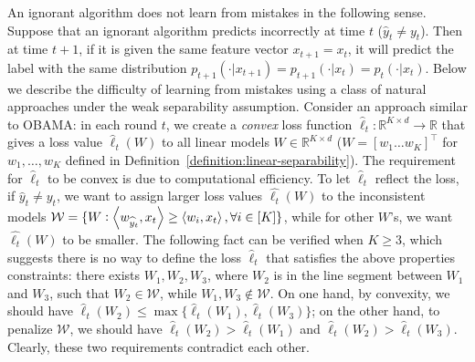 An ignorant algorithm does not learn from mistakes in the following sense. Suppose that an ignorant algorithm predicts incorrectly at time $t$ ($\widehat y_t \neq y_t$).
Then at time $t+1$, if it is given the same feature vector $x_{t+1}=x_t$, it will predict the label with the same distribution $p_{t+1}(\cdot|x_{t+1})=p_{t+1}(\cdot|x_t)=p_t(\cdot|x_t)$.
Below we describe the difficulty of learning from mistakes using a class of natural approaches under the weak separability assumption.
Consider an approach similar to OBAMA: in each round $t$,
we create a \textit{convex} loss function $\widehat \ell_t: \mathbb{R}^{K\times d}\rightarrow \mathbb{R}$ that gives a loss value $\widehat \ell_t(W)$ to
all linear models $W\in\mathbb{R}^{K\times d}$ ($W=[w_1 \ldots w_K]^\top$ for $w_1, \ldots, w_K$ defined in Definition~\ref{definition:linear-separability}).
The requirement for $\widehat{\ell}_t$ to be convex is due to computational efficiency.
To let $\widehat{\ell}_t$ reflect the loss, if $\widehat y_t \neq y_t$, we want to assign larger loss values $\widehat{\ell_t}(W)$ to the inconsistent models $\mathcal{W}=\{W: \left\langle w_{\widehat y_t}, x_t \right\rangle \geq \left\langle w_i, x_t \right\rangle, \forall i\in[K]\}$,
while for other $W$'s, we want $\widehat{\ell_t}(W)$ to be smaller.
The following fact can be verified when $K\geq 3$, which suggests there is no way to define the loss $\widehat \ell_t$ that satisfies the above properties constraints:
there exists $W_1, W_2, W_3$, where $W_2$ is in the line segment between $W_1$ and $W_3$, such that $W_2\in \mathcal{W}$, while $W_1, W_3 \notin \mathcal{W}$.
On one hand, by convexity, we should have $\widehat{\ell}_t(W_2)\leq \max\{\widehat{\ell}_t(W_1), \widehat{\ell}_t(W_3)\}$;
on the other hand, to penalize $\mathcal{W}$, we should have $\widehat{\ell}_t(W_2) > \widehat{\ell}_t(W_1)$ and $\widehat{\ell}_t(W_2) > \widehat{\ell}_t(W_3)$.
Clearly, these two requirements contradict each other.

